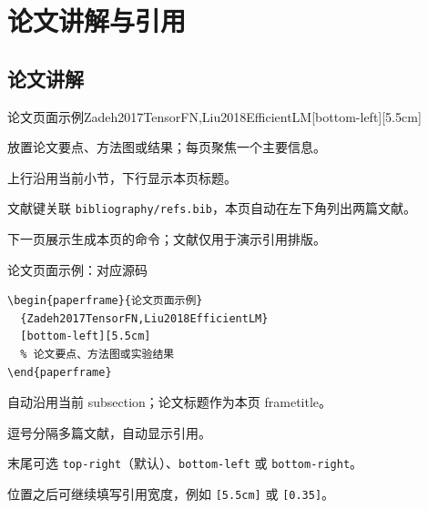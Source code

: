 \section{论文讲解与引用}
\sectiontocpage
{}
\subsection{论文讲解}

\begin{paperframe}{论文页面示例}{Zadeh2017TensorFN,Liu2018EfficientLM}[bottom-left][5.5cm]
      \begin{description}[引用]
            \item[正文] 放置论文要点、方法图或结果；每页聚焦一个主要信息。
            \item[页眉] 上行沿用当前小节，下行显示本页标题。
            \item[引用] 文献键关联 \texttt{bibliography/refs.bib}，本页自动在左下角列出两篇文献。
      \end{description}
      \medskip
      下一页展示生成本页的命令；文献仅用于演示引用排版。
\end{paperframe}

\begin{frame}[fragile]{论文页面示例：对应源码}
      \begin{verbatim}
\begin{paperframe}{论文页面示例}
  {Zadeh2017TensorFN,Liu2018EfficientLM}
  [bottom-left][5.5cm]
  % 论文要点、方法图或实验结果
\end{paperframe}
      \end{verbatim}
      \begin{description}[文献键]
            \item[页眉] 自动沿用当前 subsection；论文标题作为本页 frametitle。
            \item[文献键] 逗号分隔多篇文献，自动显示引用。
            \item[位置] 末尾可选 \texttt{top-right}（默认）、\texttt{bottom-left} 或 \texttt{bottom-right}。
            \item[宽度] 位置之后可继续填写引用宽度，例如 \texttt{[5.5cm]} 或 \texttt{[0.35\string\paperwidth]}。
      \end{description}
\end{frame}

